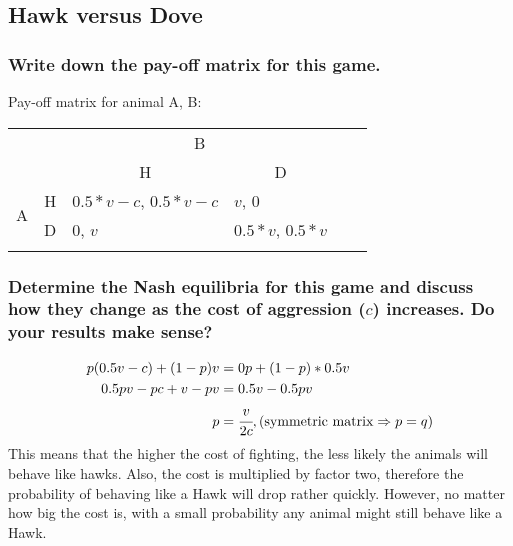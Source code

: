 \subsection{Hawk versus Dove}

    \subsubsection{Write down the pay-off matrix for this game.}
    Pay-off matrix for animal A, B:
        \begin{table}[h]
            \centering
            \begin{tabular}{llllll}
                &                                                 & \multicolumn{2}{c}{B}                                                                                               & & \\
                &                                                 & \multicolumn{1}{c}{H}                                     & \multicolumn{1}{c}{D}                                   & & \\ \cline{3-4}
                \multirow{2}{*}{A}       & \multicolumn{1}{r|}{H} & \multicolumn{1}{l|}{$0.5*v-c$, $0.5*v-c$} & \multicolumn{1}{l|}{$v$, 0}                             & & \\ \cline{3-4}
                                         & \multicolumn{1}{l|}{D} & \multicolumn{1}{l|}{0, $v$}                               & \multicolumn{1}{l|}{$0.5*v$, $0.5*v$} & & \\ \cline{3-4}
                &                        &                        &                                                           & &
            \end{tabular}
        \end{table}

    \subsubsection{Determine the Nash equilibria for this game and discuss how they change as the cost of aggression ($c$) increases. Do your results make sense?}
        \begin{align*}
            \begin{split}
                p(0.5v-c)+(1-p)v&=0p+(1-p)*0.5v\\
                0.5pv-pc+v-pv &=0.5v-0.5pv\\
                p&=\cfrac{v}{2c}, (\text{symmetric matrix}\Rightarrow p=q)
            \end{split}
        \end{align*}
        This means that the higher the cost of fighting, the less likely the animals will behave like
        hawks. Also, the cost is multiplied by factor two, therefore the probability of behaving like a Hawk will drop rather
        quickly. However, no matter how big the cost is, with a small probability any animal might still behave like
        a Hawk.

